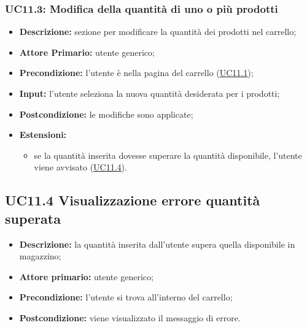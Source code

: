 \subsubsection{UC11.3: Modifica della quantità di uno o più prodotti}
\label{sec:UC11.3}
\begin{itemize}
    \item \textbf{Descrizione:} sezione per modificare la quantità dei prodotti nel carrello;
    \item \textbf{Attore Primario:} utente generico;
    \item \textbf{Precondizione:} l'utente è nella pagina del carrello (\hyperref[sec:UC11.1]{\underline{UC11.1}});
    \item \textbf{Input:} l'utente seleziona la nuova quantità desiderata per i prodotti;
    \item \textbf{Postcondizione:} le modifiche sono applicate;
    \item \textbf{Estensioni:}
          \begin{itemize}
              \item se la quantità inserita dovesse superare la quantità disponibile, l'utente viene avvisato (\hyperref[sec:UC11.4]{\underline{UC11.4}}).
          \end{itemize}
\end{itemize}
\subsection{UC11.4 Visualizzazione errore quantità superata}
\label{sec:UC11.4}
\begin{itemize}
    \item \textbf{Descrizione:} la quantità inserita dall'utente supera quella disponibile in magazzino;
    \item \textbf{Attore primario:} utente generico;
    \item \textbf{Precondizione:} l'utente si trova all'interno del carrello;
    \item \textbf{Postcondizione:} viene visualizzato il messaggio di errore.
\end{itemize}